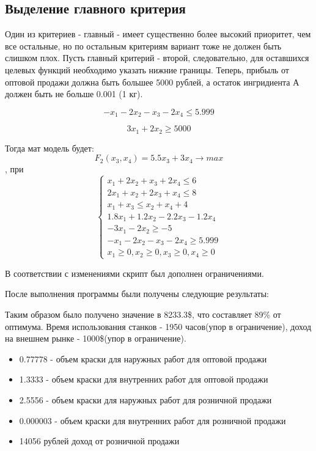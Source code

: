 \documentclass[14pt,a4paper,report]{report}
\begin{document}
\subsection{Выделение главного критерия}



Один из критериев - главный - имеет существенно более высокий приоритет, чем все остальные, но по остальным критериям вариант тоже не должен быть слишком плох. Пусть главный критерий - второй, следовательно, для оставшихся целевых функций необходимо указать нижние границы. Теперь, прибыль от оптовой продажи должна быть большее 5000 рублей, а остаток ингридиента А должен быть не больше 0.001 (1 кг).


$$ -x_1 -2x_2-x_3-2x_4 \leq 5.999 $$ 

$$ 3x_1+2x_2 \geq 5000 $$  

Тогда мат модель будет:
$$ F_2(x_3 , x_4) = 5.5x_3 + 3x_4 \rightarrow max $$
    , при 
\begin{equation*}
 \begin{cases}
 x_1 + 2x_2 + x_3 + 2x_4 \leq 6 \\
  2x_1 + x_2 + 2x_3 + x_4 \leq 8 \\
  x_1+x_3 \leq x_2+x_4+4 \\
  1.8x_1 + 1.2x_2 -2.2x_3 -1.2x_4 \\
  -3x_1-2x_2 \geq -5 \\
  -x_1-2x_2-x_3-2x_4 \geq 5.999 \\
  x_1 \geq 0 ,  x_2 \geq 0 ,  x_3 \geq 0 ,  x_4 \geq 0 
 \end{cases}
\end{equation*}

В соответствии с изменениями скрипт был дополнен ограничениями.


После выполнения программы были получены следующие результаты:


Таким образом было получено значение в 8233.3\$, что составляет 89\% от оптимума. 
Время использования станков - 1950 часов(упор в ограничение), доход на внешнем рынке - 1000\$(упор в ограничение).
\begin{itemize}
\item 0.77778 - объем краски для наружных работ для оптовой продажи
\item 1.3333 - объем краски  для внутренних работ для оптовой продажи 
\item 2.5556 - объем краски  для наружных работ для розничной продажи 
\item 0.000003 - объем краски  для внутренних работ для розничной продажи 
\item 14056 рублей доход от розничной продажи
\end{itemize}
\end{document}
